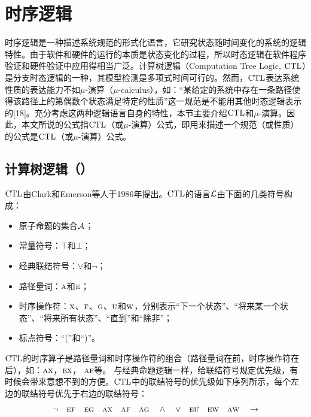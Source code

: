 \section{时序逻辑}
时序逻辑是一种描述系统规范的形式化语言，它研究状态随时间变化的系统的逻辑特性。由于软件和硬件的运行的本质是状态变化的过程，所以时态逻辑在软件程序验证和硬件验证中应用得相当广泛。计算树逻辑（Computation Tree Logic, $\textrm{CTL}$）是分支时态逻辑的一种，其模型检测是多项式时间可行的。然而，$\textrm{CTL}$表达系统性质的表达能力不如$\mu$-演算（$\mu$-calculus），如：“某给定的系统中存在一条路径使得该路径上的第偶数个状态满足特定的性质”这一规范是不能用其他时态逻辑表示的[18]。充分考虑这两种逻辑语言自身的特性，本节主要介绍$\textrm{CTL}$和$\mu$-演算。因此，本文所说的公式指$\textrm{CTL}$（或$\mu$-演算）公式，即用来描述一个规范（或性质）的公式是$\textrm{CTL}$（或$\mu$-演算）公式。

\subsection{计算树逻辑（\CTL）}
$\textrm{CTL}$由Clark和Emerson等人于1986年提出\cite{DBLP:journals/toplas/ClarkeES86}。$\textrm{CTL}$的语言${\cal L}$由下面的几类符号构成：
\begin{itemize}
	\item 原子命题的集合${\cal A}$；
	\item 常量符号：$\top$和$\bot$；
	\item 经典联结符号：$\vee$和$\neg$；
	\item 路径量词：$\textsc{a}$和$\textsc{e}$；
	\item 时序操作符：$\textsc{x}$、$\textsc{f}$、$\textsc{g}$、$\textsc{u}$和$\textsc{w}$，分别表示“下一个状态”、“将来某一个状态”、“将来所有状态”、“直到”和“除非”；
	\item 标点符号：“(”和“)”。
\end{itemize}
$\textrm{CTL}$的时序算子是路径量词和时序操作符的组合（路径量词在前，时序操作符在后），如：$\textsc{a} \textsc{x}$，$\textsc{e} \textsc{x}$， $\textsc{a} \textsc{f}$等。
与经典命题逻辑一样，给联结符号规定优先级，有时候会带来意想不到的方便。$\textrm{CTL}$中的联结符号的优先级如下序列所示，每个左边的联结符号优先于右边的联结符号：
\[
\neg \quad \textsc{e}\textsc{f} \quad \textsc{e}\textsc{g} \quad \textsc{a}\textsc{x} \quad \textsc{a}\textsc{f} \quad \textsc{a}\textsc{g} \quad \wedge \quad \vee \quad \textsc{e}\textsc{u} \quad \textsc{e}\textsc{w} \quad \textsc{a}\textsc{w} \quad \rightarrow
\]

